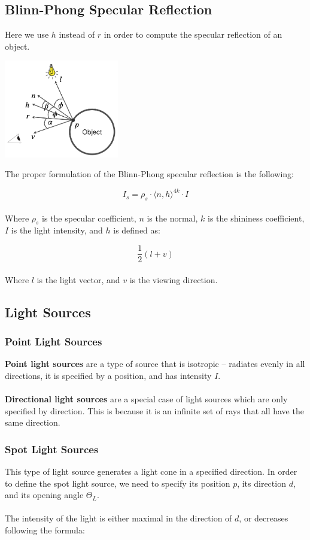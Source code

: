 \documentclass{article}
\begin{document}
\subsection{Blinn-Phong Specular Reflection}
Here we use $h$ instead of $r$ in order to compute the specular reflection of an object.

\begin{center}
	\includegraphics[width=5cm]{blinn_phong.png}
\end{center}
The proper formulation of the Blinn-Phong specular reflection is the following:

\[ I_s = \rho_s \cdot \langle n, h \rangle^{4k} \cdot I \] \\
Where $\rho_s$ is the specular coefficient, $n$ is the normal, $k$ is the shininess coefficient, $I$ is the light intensity, and $h$ is defined as:

\[ \frac{1}{2}(l + v) \] \\
Where $l$ is the light vector, and $v$ is the viewing direction.

\subsection{Light Sources}
\subsubsection{Point Light Sources}
\textbf{Point light sources} are a type of source that is isotropic -- radiates evenly in all directions, it is specified by a position, and has intensity $I$. \\ \\
\textbf{Directional light sources} are a special case of light sources which are only specified by direction. This is because it is an infinite set of rays that all have the same direction.

\subsubsection{Spot Light Sources}
This type of light source generates a light cone in a specified direction. In order to define the spot light source, we need to specify its position $p$, its direction $d$, and its opening angle $\Theta_L$.\\ \\
The intensity of the light is either maximal in the direction of $d$, or decreases following the formula:
\end{document}
